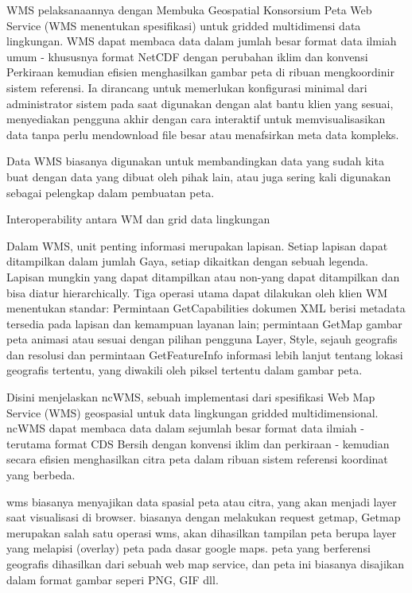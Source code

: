    WMS pelaksanaannya dengan Membuka Geospatial Konsorsium Peta Web Service (WMS menentukan spesifikasi) untuk gridded multidimensi data lingkungan. WMS dapat membaca data dalam jumlah besar format data ilmiah umum - khususnya format NetCDF dengan perubahan iklim dan konvensi Perkiraan kemudian efisien menghasilkan gambar peta di ribuan mengkoordinir sistem referensi. Ia dirancang untuk memerlukan konfigurasi minimal dari administrator sistem pada saat digunakan dengan alat bantu klien yang sesuai, menyediakan pengguna akhir dengan cara interaktif untuk memvisualisasikan data tanpa perlu mendownload file besar atau menafsirkan meta data kompleks. 

Data WMS biasanya digunakan untuk membandingkan data yang sudah kita buat dengan data yang dibuat oleh pihak lain, atau juga sering kali
digunakan sebagai pelengkap dalam pembuatan peta.

Interoperability antara WM dan grid data lingkungan

Dalam WMS, unit penting informasi merupakan lapisan. Setiap lapisan dapat ditampilkan dalam jumlah Gaya, setiap dikaitkan dengan sebuah
legenda. Lapisan mungkin yang dapat ditampilkan atau non-yang dapat ditampilkan dan bisa diatur hierarchically. Tiga operasi utama dapat
dilakukan oleh klien WM menentukan standar: Permintaan GetCapabilities dokumen XML berisi metadata tersedia pada lapisan dan kemampuan
layanan lain; permintaan GetMap gambar peta animasi atau sesuai dengan pilihan pengguna Layer, Style, sejauh geografis dan resolusi dan
permintaan GetFeatureInfo informasi lebih lanjut tentang lokasi geografis tertentu, yang diwakili oleh piksel tertentu dalam gambar
peta.

Disini menjelaskan ncWMS, sebuah implementasi dari spesifikasi Web Map Service (WMS) geospasial untuk data lingkungan gridded multidimensional. ncWMS dapat membaca data dalam sejumlah besar format data ilmiah - terutama format CDS Bersih dengan konvensi iklim dan perkiraan - kemudian secara efisien menghasilkan citra peta dalam ribuan sistem referensi koordinat yang berbeda.

wms biasanya menyajikan data spasial peta atau citra, yang akan menjadi layer saat visualisasi di browser. 
biasanya dengan melakukan request getmap, Getmap merupakan salah satu operasi wms, akan dihasilkan tampilan peta berupa layer yang melapisi (overlay) peta pada dasar google maps. peta yang berferensi geografis dihasilkan dari sebuah web map service, dan peta ini biasanya disajikan dalam format gambar seperi PNG, GIF dll.

